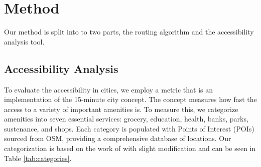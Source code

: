 \clearpage
\section{Method}
\label{sec:method}

Our method is split into to two parts, the routing algorithm and the accessibility analysis tool.

\subsection{Accessibility Analysis}
\label{subs:accessibility_analysis}

To evaluate the accessibility in cities, we employ a metric that is an implementation of the 15-minute city concept. The concept measures how fast the access to a variety of important amenities is.
To measure this, we categorize amenities into seven essential services: grocery, education, health, banks, parks, sustenance, and shops.
Each category is populated with Points of Interest (POIs) sourced from OSM, providing a comprehensive database of locations.
Our categorization is based on the work of \cite{olivariAreItalianCities2023} with slight modification and can be seen in Table \ref{tab:categories}.

